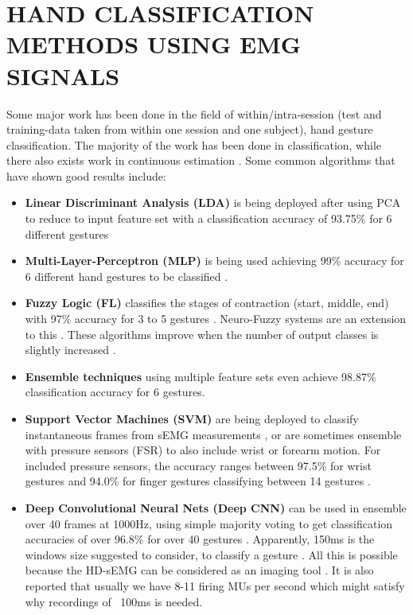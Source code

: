 \documentclass{article}
\begin{document}
\section{HAND CLASSIFICATION METHODS USING EMG SIGNALS}
Some major work has been done in the field of within/intra-session (test and training-data taken from within one session and one subject), hand gesture classification. The majority of the work has been done in classification, while there also exists work in continuous estimation \cite{El-Khoury2015}. Some common algorithms that have shown good results include:

\begin{itemize}
\item \textbf{Linear Discriminant Analysis (LDA)} is being deployed after using PCA to reduce to input feature set with a classification accuracy of 93.75\% for 6 different gestures \cite{Englehart2001}
\item \textbf{Multi-Layer-Perceptron (MLP)} is being used achieving 99\% accuracy for 6 different hand gestures to be classified \cite{Khushaba2007} \cite{Nazmi2016}.
\item\textbf{Fuzzy Logic (FL)} classifies the stages of contraction (start, middle, end) with 97\% accuracy for 3 to 5 gestures \cite{Ahmad2009} \cite{Nazmi2016}. Neuro-Fuzzy systems are an extension to this \cite{Khezri2011}. These algorithms improve when the number of output classes is slightly increased \cite{El-Khoury2015}.
\item\textbf{Ensemble techniques} using multiple feature sets even achieve 98.87\% classification accuracy for 6 gestures\cite{Nazmi2016}.
\item\textbf{Support Vector Machines (SVM)} are being deployed to classify instantaneous frames from sEMG measurements \cite{Saponas2010}, or are sometimes ensemble with pressure sensors (FSR) to also include wrist \cite{McIntosh2016} or forearm motion. For included pressure sensors, the accuracy ranges between 97.5\% for wrist gestures and 94.0\% for finger gestures classifying between 14 gestures \cite{McIntosh2016}.
\newline
\item\textbf{Deep Convolutional Neural Nets (Deep CNN)} can be used in ensemble over 40 frames at 1000Hz, using simple majority voting to get classification accuracies of over 96.8\% for over 40 gestures \cite{Geng2016}. Apparently, 150ms is the windows size suggested to consider, to classify a gesture \cite{Geng2016}. All this is possible because the HD-sEMG can be considered as an imaging tool \cite{Merletti2008}. It is also reported that usually we have 8-11 firing MUs per second \cite{Martinez-Valdes2016} which might satisfy why recordings of ~100ms is needed.
\end{itemize}
\end{document}
